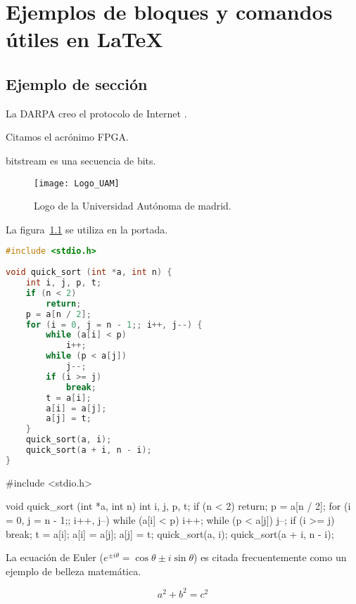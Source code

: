 \chapter{Ejemplos de bloques y comandos útiles en LaTeX\label{sec:ejemplos}}
\section{Ejemplo de sección}

%
%

La DARPA creo el protocolo de Internet \cite{ipv4sta}.

Citamos el acrónimo \gls{FPGA}.

\Gls{bitstream} es una secuencia de bits.

\begin{figure}[htp!]
  \centering
  \texttt{[image: Logo\_UAM]}
  \caption{Logo de la Universidad Autónoma de madrid.}
  \label{fig:logo_uam}
\end{figure} 

La figura~\ref{fig:logo_uam} se utiliza en la portada.

\clearpage

\begin{lstlisting}[label=algoritmo:quicksort,language=C,frame=single,caption=Algoritmo de ordenación Quicksort]
#include <stdio.h>
 
void quick_sort (int *a, int n) {
    int i, j, p, t;
    if (n < 2)
        return;
    p = a[n / 2];
    for (i = 0, j = n - 1;; i++, j--) {
        while (a[i] < p)
            i++;
        while (p < a[j])
            j--;
        if (i >= j)
            break;
        t = a[i];
        a[i] = a[j];
        a[j] = t;
    }
    quick_sort(a, i);
    quick_sort(a + i, n - i);
}
\end{lstlisting}

\begin{code}
#include <stdio.h>
 
void quick_sort (int *a, int n) {
    int i, j, p, t;
    if (n < 2)
        return;
    p = a[n / 2];
    for (i = 0, j = n - 1;; i++, j--) {
        while (a[i] < p)
            i++;
        while (p < a[j])
            j--;
        if (i >= j)
            break;
        t = a[i];
        a[i] = a[j];
        a[j] = t;
    }
    quick_sort(a, i);
    quick_sort(a + i, n - i);
}
\end{code}

La ecuación de Euler ($e^{ \pm i\theta } = \cos \theta \pm i\sin \theta$) es citada frecuentemente como un ejemplo de belleza matemática.

\begin{equation}\label{eq:pythagoras}
a^2 + b^2 = c^2
\end{equation}
